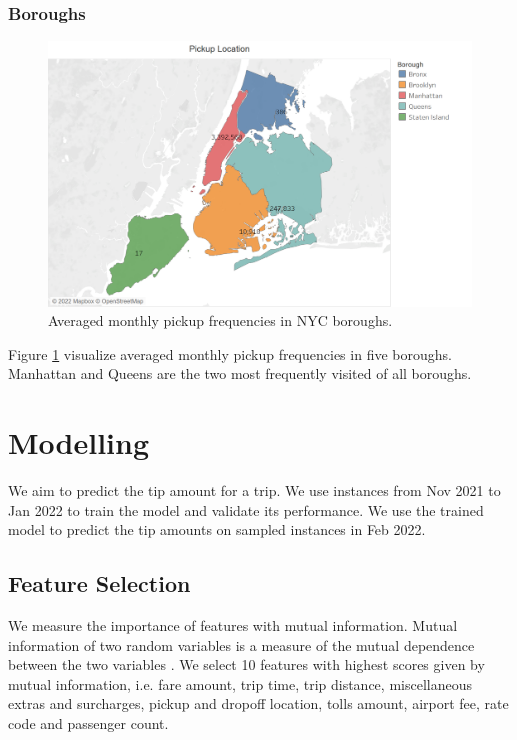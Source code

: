 \documentclass[11pt]{article}
\begin{document}
\subsubsection{Boroughs}
\begin{figure}
    \centering
    \includegraphics[scale = 0.25]{pickup.png}
    \caption{Averaged monthly pickup frequencies in NYC boroughs.}
    \label{fig:borough}
\end{figure}
Figure \ref{fig:borough} visualize averaged monthly pickup frequencies in five boroughs. Manhattan and Queens are the two most frequently visited of all boroughs. 

\section{Modelling}
We aim to predict the tip amount for a trip. We use instances from Nov 2021 to Jan 2022 to train the model and validate its performance. We use the trained model to predict the tip amounts on sampled instances in Feb 2022. 

\subsection{Feature Selection}
We measure the importance of features with mutual information. Mutual information of two random variables is a measure of the mutual dependence between the two variables \cite{mutual}. We select 10 features with highest scores given by mutual information, i.e. fare amount, trip time, trip distance, miscellaneous extras and surcharges, pickup and dropoff location, tolls amount, airport fee, rate code and passenger count.
\end{document}

